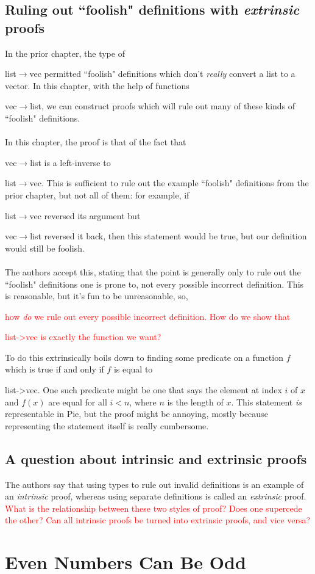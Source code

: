 \documentclass{article}
\newcommand*{\SavedLstInline}{}
\DeclareRobustCommand*{\lstinline}{%
  \ifmmode
    \let\SavedBGroup\bgroup
    \def\bgroup{%
      \let\bgroup\SavedBGroup
      \hbox\bgroup
    }%
  \fi
  \SavedLstInline
}
\begin{document}
\subsection{Ruling out ``foolish" definitions with \textit{extrinsic} proofs}
In the prior chapter, the type of \lstinline{list\(\to\)vec} permitted ``foolish" definitions which don't \textit{really} convert a list to a vector. In this chapter, with the help of functions \lstinline{vec\(\to\)list}, we can construct proofs which will rule out many of these kinds of ``foolish" definitions.
\\ \\
In this chapter, the proof is that of the fact that \lstinline{vec\(\to\)list} is a left-inverse to \lstinline{list\(\to\)vec}. This is sufficient to rule out the example ``foolish" definitions from the prior chapter, but not all of them: for example, if \lstinline{list\(\to\)vec} reversed its argument but \lstinline{vec\(\to\)list} reversed it back, then this statement would be true, but our definition would still be foolish.
\\ \\
The authors accept this, stating that the point is generally only to rule out the ``foolish" definitions one is prone to, not every possible incorrect definition. This is reasonable, but it's fun to be unreasonable, so, \textcolor{red}{how \textit{do} we rule out every possible incorrect definition. How do we show that \lstinline{list->vec} is exactly the function we want?} To do this extrinsically boils down to finding some predicate on a function \(f\) which is true if and only if \(f\) is equal to \lstinline{list->vec}. One such predicate might be one that says the element at index \(i\) of \(x\) and \(f(x)\) are equal for all \(i < n\), where \(n\) is the length of \(x\). This statement \textit{is} representable in Pie, but the proof might be annoying, mostly because representing the statement itself is really cumbersome.
\subsection{A question about intrinsic and extrinsic proofs}
The authors say that using types to rule out invalid definitions is an example of an \textit{intrinsic} proof, whereas using separate definitions is called an \textit{extrinsic} proof. \textcolor{red}{What is the relationship between these two styles of proof? Does one supercede the other? Can all intrinsic proofs be turned into extrinsic proofs, and vice versa?}
\section{Even Numbers Can Be Odd}
\end{document}
